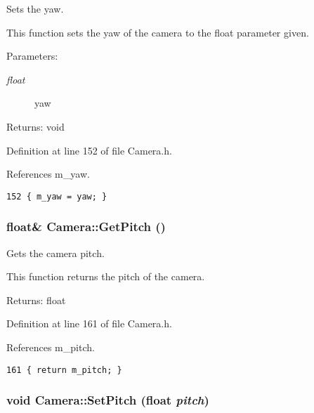 Sets the yaw. 

This function sets the yaw of the camera to the float parameter given.

\begin{Desc}
\item[Parameters:]
\begin{description}
\item[{\em float}]yaw \end{description}
\end{Desc}
\begin{Desc}
\item[Returns:]void \end{Desc}


Definition at line 152 of file Camera.h.

References m\_\-yaw.

\begin{Code}\begin{verbatim}152 { m_yaw = yaw; }
\end{verbatim}
\end{Code}


\hypertarget{class_camera_7cdeaf63fbab2011eca767f238668a06}{
\subsubsection[GetPitch]{\setlength{\rightskip}{0pt plus 5cm}float\& Camera::GetPitch ()}}
\label{class_camera_7cdeaf63fbab2011eca767f238668a06}


Gets the camera pitch. 

This function returns the pitch of the camera.

\begin{Desc}
\item[Returns:]float \end{Desc}


Definition at line 161 of file Camera.h.

References m\_\-pitch.

\begin{Code}\begin{verbatim}161 { return m_pitch; }
\end{verbatim}
\end{Code}


\hypertarget{class_camera_bd3daba04eb01231eec1d5fdbe862d52}{
\subsubsection[SetPitch]{\setlength{\rightskip}{0pt plus 5cm}void Camera::SetPitch (float {\em pitch})}}
\label{class_camera_bd3daba04eb01231eec1d5fdbe862d52}


